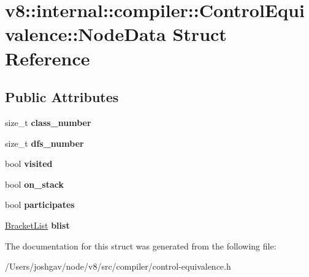 \hypertarget{structv8_1_1internal_1_1compiler_1_1_control_equivalence_1_1_node_data}{}\section{v8\+:\+:internal\+:\+:compiler\+:\+:Control\+Equivalence\+:\+:Node\+Data Struct Reference}
\label{structv8_1_1internal_1_1compiler_1_1_control_equivalence_1_1_node_data}
\subsection*{Public Attributes}
\begin{DoxyCompactItemize}
\item 
size\+\_\+t {\bfseries class\+\_\+number}\hypertarget{structv8_1_1internal_1_1compiler_1_1_control_equivalence_1_1_node_data_a392c8304def66b42170365b9fa3b5baf}{}\label{structv8_1_1internal_1_1compiler_1_1_control_equivalence_1_1_node_data_a392c8304def66b42170365b9fa3b5baf}

\item 
size\+\_\+t {\bfseries dfs\+\_\+number}\hypertarget{structv8_1_1internal_1_1compiler_1_1_control_equivalence_1_1_node_data_a2e0f8e15e7adcebf28f99cf53e340909}{}\label{structv8_1_1internal_1_1compiler_1_1_control_equivalence_1_1_node_data_a2e0f8e15e7adcebf28f99cf53e340909}

\item 
bool {\bfseries visited}\hypertarget{structv8_1_1internal_1_1compiler_1_1_control_equivalence_1_1_node_data_a4b5db2682bef650287ec1c1c30ee495c}{}\label{structv8_1_1internal_1_1compiler_1_1_control_equivalence_1_1_node_data_a4b5db2682bef650287ec1c1c30ee495c}

\item 
bool {\bfseries on\+\_\+stack}\hypertarget{structv8_1_1internal_1_1compiler_1_1_control_equivalence_1_1_node_data_a7a4fe40e0549cee030a365e1d1b840c3}{}\label{structv8_1_1internal_1_1compiler_1_1_control_equivalence_1_1_node_data_a7a4fe40e0549cee030a365e1d1b840c3}

\item 
bool {\bfseries participates}\hypertarget{structv8_1_1internal_1_1compiler_1_1_control_equivalence_1_1_node_data_ace8315d7308ecf998a5372e10abb4d32}{}\label{structv8_1_1internal_1_1compiler_1_1_control_equivalence_1_1_node_data_ace8315d7308ecf998a5372e10abb4d32}

\item 
\hyperlink{classv8_1_1internal_1_1_zone_linked_list}{Bracket\+List} {\bfseries blist}\hypertarget{structv8_1_1internal_1_1compiler_1_1_control_equivalence_1_1_node_data_a8d61d1708da895cfe36736227c1452fa}{}\label{structv8_1_1internal_1_1compiler_1_1_control_equivalence_1_1_node_data_a8d61d1708da895cfe36736227c1452fa}

\end{DoxyCompactItemize}


The documentation for this struct was generated from the following file\+:\begin{DoxyCompactItemize}
\item 
/\+Users/joshgav/node/v8/src/compiler/control-\/equivalence.\+h\end{DoxyCompactItemize}
